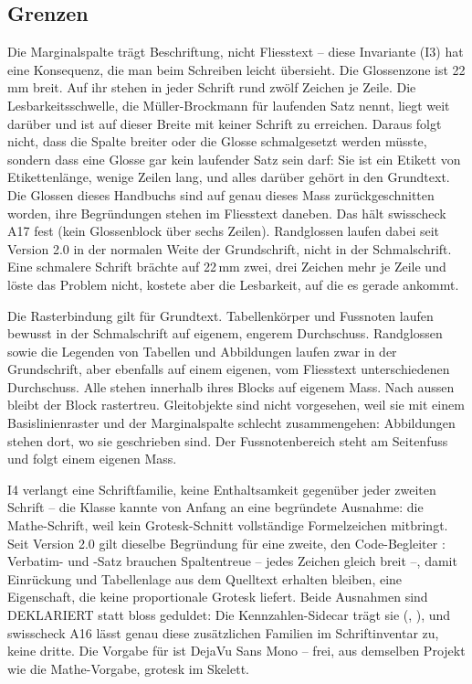 \documentclass[tint=true]{swisstex}
\let\code\swisscode
\begin{document}
\subsection{Grenzen}

Die Marginalspalte trägt Beschriftung, nicht Fliesstext -- diese Invariante
(I3) hat eine Konsequenz, die man beim Schreiben leicht übersieht. Die
Glossenzone ist 22\,mm breit. Auf ihr stehen in jeder Schrift rund zwölf
Zeichen je Zeile. Die Lesbarkeitsschwelle, die Müller-Brockmann für laufenden
Satz nennt, liegt weit darüber und ist auf dieser Breite mit keiner Schrift
zu erreichen. Daraus folgt nicht, dass die Spalte breiter oder die Glosse
schmalgesetzt werden müsste, sondern dass eine Glosse gar kein laufender Satz
sein darf: Sie ist ein Etikett von Etikettenlänge, wenige Zeilen lang, und
alles darüber gehört in den Grundtext. Die Glossen dieses Handbuchs sind auf
genau dieses Mass zurückgeschnitten worden, ihre Begründungen stehen im
Fliesstext daneben. Das hält swisscheck A17 fest (kein Glossenblock
über sechs Zeilen). Randglossen laufen dabei seit Version 2.0 in der
normalen Weite der Grundschrift, nicht in der Schmalschrift. Eine
schmalere Schrift brächte auf 22\,mm zwei, drei Zeichen mehr je Zeile und
löste das Problem nicht, kostete aber die Lesbarkeit, auf die es gerade
ankommt.

Die Rasterbindung gilt für Grundtext. Tabellenkörper und Fussnoten laufen
bewusst in der Schmalschrift auf eigenem, engerem Durchschuss. Randglossen
sowie die Legenden von Tabellen und Abbildungen laufen zwar in der
Grundschrift, aber ebenfalls auf einem eigenen, vom Fliesstext
unterschiedenen Durchschuss. Alle stehen innerhalb ihres Blocks auf eigenem
Mass. Nach aussen bleibt der Block rastertreu. Gleitobjekte sind
nicht vorgesehen, weil sie mit einem Basislinienraster und der Marginalspalte
schlecht zusammengehen: Abbildungen stehen dort, wo sie geschrieben sind. Der
Fussnotenbereich steht am Seitenfuss und folgt einem eigenen Mass.

I4 verlangt eine Schriftfamilie, keine Enthaltsamkeit gegenüber jeder
zweiten Schrift -- die Klasse kannte von Anfang an eine begründete
Ausnahme: die Mathe-Schrift, weil kein Grotesk-Schnitt vollständige
Formelzeichen mitbringt. Seit Version 2.0 gilt dieselbe Begründung für eine
zweite, den Code-Begleiter \code{\textbackslash swisscodeface}: Verbatim-
und \code{\textbackslash verb}-Satz brauchen Spaltentreue -- jedes Zeichen
gleich breit --, damit Einrückung und Tabellenlage aus dem Quelltext
erhalten bleiben, eine Eigenschaft, die keine proportionale Grotesk liefert.
Beide Ausnahmen sind DEKLARIERT statt bloss geduldet: Die Kennzahlen-Sidecar
trägt sie (\code{mathfont}, \code{codeface}), und swisscheck A16 lässt genau
diese zusätzlichen Familien im Schriftinventar zu, keine dritte. Die
Vorgabe für \code{codeface} ist DejaVu Sans Mono -- frei, aus demselben
Projekt wie die Mathe-Vorgabe, grotesk im Skelett.
\end{document}
